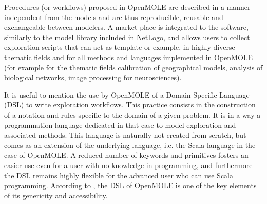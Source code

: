 \documentclass[10pt]{article}
\begin{document}
Procedures (or workflows) proposed in OpenMOLE are described in a manner independent from the models and are thus reproducible, reusable and exchangeable between modelers. A market place is integrated to the software, similarly to the model library included in NetLogo, and allows users to collect exploration scripts that can act as template or example, in highly diverse thematic fields and for all methods and languages implemented in OpenMOLE (for example for the thematic fields calibration of geographical models, analysis of biological networks, image processing for neurosciences).


It is useful to mention the use by OpenMOLE of a Domain Specific Language (DSL) \citep{van2002domain} to write exploration workflows. This practice consists in the construction of a notation and rules specific to the domain of a given problem. It is in a way a programmation language dedicated in that case to model exploration and associated methods. This language is naturally not created from scratch, but comes as an extension of the underlying language, i.e. the Scala language in the case of OpenMOLE. A reduced number of keywords and primitives fosters an easier use even for a user with no knowledge in programming, and furthermore the DSL remains highly flexible for the advanced user who can use Scala programming. According to \cite{passerat2017reproducible}, the DSL of OpenMOLE is one of the key elements of its genericity and accessibility.
\end{document}

